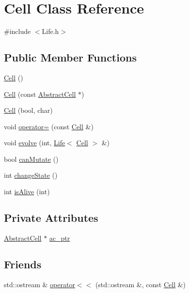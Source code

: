 \hypertarget{classCell}{\section{Cell Class Reference}
\label{classCell}
}


{\ttfamily \#include $<$Life.\-h$>$}

\subsection*{Public Member Functions}
\begin{DoxyCompactItemize}
\item 
\hyperlink{classCell_a394510643e8664cf12b5efaf5cb99f71}{Cell} ()
\item 
\hyperlink{classCell_a05a40af833aa8976b67a109385bd3cb0}{Cell} (const \hyperlink{classAbstractCell}{Abstract\-Cell} $\ast$)
\item 
\hyperlink{classCell_a4f4f93a1878d4dd7bac8f7df6629068b}{Cell} (bool, char)
\item 
void \hyperlink{classCell_a956383653c570c0b085752c2a9bdd89c}{operator=} (const \hyperlink{classCell}{Cell} \&)
\item 
void \hyperlink{classCell_aeefadf6295020f9cbfb52d50a3721b2c}{evolve} (int, \hyperlink{classLife}{Life}$<$ \hyperlink{classCell}{Cell} $>$ \&)
\item 
bool \hyperlink{classCell_a63bbde8923e149c01d5ef6e3e9492a97}{can\-Mutate} ()
\item 
int \hyperlink{classCell_ac372cb0291cec89407f82ad3c306513a}{change\-State} ()
\item 
int \hyperlink{classCell_a508e59acbfa9e14d327246238c7cc181}{is\-Alive} (int)
\end{DoxyCompactItemize}
\subsection*{Private Attributes}
\begin{DoxyCompactItemize}
\item 
\hyperlink{classAbstractCell}{Abstract\-Cell} $\ast$ \hyperlink{classCell_ac51b82d0179572d599b7837e4df90e4d}{ac\-\_\-ptr}
\end{DoxyCompactItemize}
\subsection*{Friends}
\begin{DoxyCompactItemize}
\item 
std\-::ostream \& \hyperlink{classCell_abe6e58e7a719ee8f4a34181ccca158a2}{operator$<$$<$} (std\-::ostream \&, const \hyperlink{classCell}{Cell} \&)
\end{DoxyCompactItemize}


